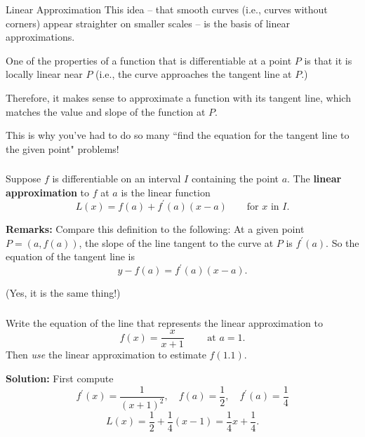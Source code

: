 \documentclass[cal1spr16Lectures.tex]{subfiles}
\begin{document}
\begin{frame}{\small Linear Approximation}
\footnotesize
This idea -- that \alert{smooth} curves (i.e., curves without corners) appear straighter on smaller scales -- is the basis of linear approximations.

\vspace{1pc}
One of the properties of a function that is \alert{differentiable} at a point $P$ is that it is \alert{locally linear} near $P$ (i.e., the curve approaches the tangent line at $P$.)

\vspace{1pc}
Therefore, it makes sense to approximate a function with its tangent line, which matches the value and slope of the function at $P$.  

\vspace{1pc}
This is why you've had to do so many ``find the equation for the tangent line to the given point" problems!
\end{frame}

\begin{frame}
\frametitle{}
\footnotesize
\begin{dfn} Suppose $f$ is differentiable on an interval $I$ containing the point $a$.  The {\bf linear approximation} to $f$ at $a$ is the linear function
\[L(x)=f(a)+f^{\prime}(a)(x-a)\qquad\text{for $x$ in $I$.}\]
\end{dfn}

\vspace{1pc}
{\bf Remarks:} Compare this definition to the following: At a given point $P=(a,f(a))$, the slope of the line tangent to the curve at $P$ is $f^{\prime}(a)$.  So the equation of the tangent line is
\[y-f(a)=f^{\prime}(a)(x-a).\]

(Yes, it is the same thing!)
\end{frame}

\begin{frame}
\frametitle{}
\small
\begin{exe} Write the equation of the line that represents the linear approximation to 
\[f(x)=\dfrac{x}{x+1}\qquad\text{ at $a=1$.}\]  
Then {\it use} the linear approximation to estimate $f(1.1)$. \end{exe}

\vspace{1pc}
{\bf Solution:} First compute
\[f^{\prime}(x)=\dfrac{1}{(x+1)^2},\quad f(a)=\dfrac{1}{2},\quad f^{\prime}(a)=\dfrac{1}{4}\]
\[L(x)=\dfrac{1}{2}+\dfrac{1}{4}(x-1)=\dfrac{1}{4}x+\dfrac{1}{4}.\]
\end{frame}
\end{document}
